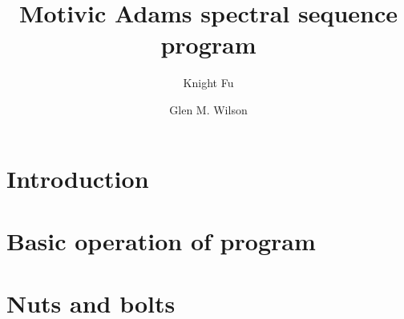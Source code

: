 \documentclass{article}
\begin{document}
\title{Motivic Adams spectral sequence program}
\author{Knight Fu}
\author{Glen M. Wilson}
\maketitle


\section{Introduction}

\section{Basic operation of program}

\section{Nuts and bolts}
\end{document}

